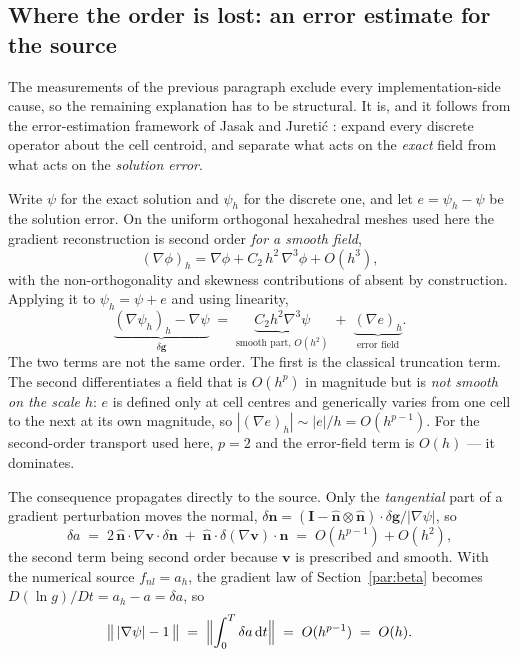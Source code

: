 \documentclass[preprint,3p,11pt]{elsarticle}
\newcommand{\psilev}{\psi}
\newcommand{\nhat}{\hat{\mathbf{n}}}
\newcommand{\gradpsi}{\lvert\nabla\psilev\rvert}
\begin{document}
\subsection{Where the order is lost: an error estimate for the source}
\label{sec:sourceerror}

The measurements of the previous paragraph exclude every implementation-side
cause, so the remaining explanation has to be structural. It is, and it follows
from the error-estimation framework of Jasak \cite{jasak1996} and Jureti\'{c}
\cite{juretic2004,juretic2010}: expand every discrete operator about the cell
centroid, and separate what acts on the \emph{exact} field from what acts on the
\emph{solution error}.

Write $\psilev$ for the exact solution and $\psilev_h$ for the discrete one, and
let $e = \psilev_h - \psilev$ be the solution error. On the uniform orthogonal
hexahedral meshes used here the gradient reconstruction is second order
\emph{for a smooth field},
\begin{equation}
  (\nabla\phi)_h = \nabla\phi + C_2\,h^2\,\nabla^3\phi + O(h^3),
  \label{eq:gradtrunc}
\end{equation}
with the non-orthogonality and skewness contributions of
\cite{juretic2004,juretic2010} absent by construction. Applying it to
$\psilev_h = \psilev + e$ and using linearity,
\begin{equation}
  \underbrace{(\nabla\psilev_h)_h - \nabla\psilev}_{\displaystyle \delta\mathbf{g}}
  \;=\; \underbrace{C_2 h^2 \nabla^3\psilev}_{\text{smooth part, } O(h^2)}
  \;+\; \underbrace{(\nabla e)_h}_{\text{error field}} .
  \label{eq:gradsplit}
\end{equation}
The two terms are not the same order. The first is the classical truncation
term. The second differentiates a field that is $O(h^p)$ in magnitude but is
\emph{not smooth on the scale $h$}: $e$ is defined only at cell centres and
generically varies from one cell to the next at its own magnitude, so
$|(\nabla e)_h| \sim |e|/h = O(h^{p-1})$. For the second-order transport used
here, $p=2$ and the error-field term is $O(h)$ --- it dominates.

The consequence propagates directly to the source. Only the \emph{tangential}
part of a gradient perturbation moves the normal,
$\delta\mathbf{n} = (\mathbf{I}-\nhat\otimes\nhat)\cdot\delta\mathbf{g}/\gradpsi$,
so
\begin{equation}
  \delta a \;=\; 2\,\nhat\cdot\nabla\mathbf{v}\cdot\delta\mathbf{n}
              \;+\; \nhat\cdot\delta(\nabla\mathbf{v})\cdot\nhat
        \;=\; O(h^{p-1}) + O(h^2),
  \label{eq:straerr}
\end{equation}
the second term being second order because $\mathbf{v}$ is prescribed and
smooth. With the numerical source $f_{nl}=a_h$, the gradient law of
Section~\ref{par:beta} becomes $D(\ln g)/Dt = a_h - a = \delta a$, so
\begin{equation}
  \bigl\|\,\gradpsi-1\,\bigr\| \;=\; \Bigl\|\int_0^T \delta a\,\mathrm dt\Bigr\|
  \;=\; O(h^{p-1}) \;=\; O(h) .
  \label{eq:sdplsorder}
\end{equation}
\end{document}
